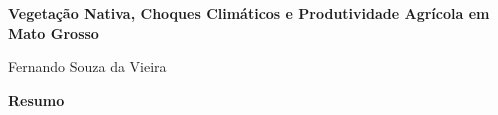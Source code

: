\documentclass[a4paper,12pt,twoside,openany,brazil]{abntex2}
\begin{document}
\pagestyle{plain}

\begin{center}
    {\Large \bfseries Vegetação Nativa, Choques Climáticos e Produtividade Agrícola em Mato Grosso}\par\vspace{0.8cm}
    Fernando Souza da Vieira
\end{center}

\vspace{0.8cm}

\noindent\textbf{Resumo}











\end{document}
